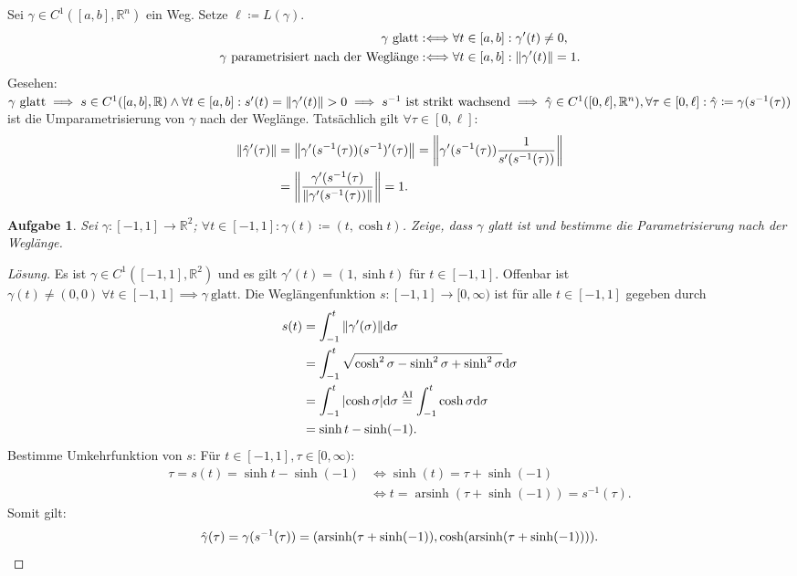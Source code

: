\documentclass[a4paper]{article}
\newtheorem{aufgabe}{Aufgabe}
\theoremstyle{definition}
\theoremstyle{remark}
\newcommand{\defiff}{:\Longleftrightarrow}
\renewcommand{\d}[1]{\mathrm{d}#1}
\DeclareMathOperator{\arsinh}{arsinh}
\begin{document}
		Sei $\gamma\in C^1([a, b], \mathbb{R}^n)$ ein Weg. Setze $\ell\coloneqq L(\gamma)$.
		\begin{align*}
			\gamma~\text{glatt}&\defiff\forall t\in[a, b]:\gamma'(t)\neq0,\\
			\gamma~\text{parametrisiert nach der Weglänge}&\defiff\forall t\in[a,b]:\norm{\gamma'(t)}=1.
		\end{align*}
		Gesehen: $\gamma~\text{glatt}\implies s\in C^1([a, b], \mathbb{R})\wedge\forall t\in[a, b]:
		s'(t)=\norm{\gamma'(t)}>0\implies s^{-1}~\text{ist strikt wachsend}
		\implies\hat{\gamma}\in C^1([0, \ell], \mathbb{R}^n), \forall\tau\in[0, \ell]:
		\hat{\gamma}\coloneqq\gamma(s^{-1}(\tau))$ ist die Umparametrisierung von
		$\gamma$ nach der Weglänge. Tatsächlich gilt $\forall\tau\in[0, \ell]$:
		\begin{align*}
			\norm{\hat{\gamma}'(\tau)}&=\norm{\gamma'(s^{-1}(\tau))(s^{-1})'(\tau)}=\norm{\gamma'(s^{-1}(\tau))\frac{1}{s'(s^{-1}(\tau))}}\\
			&= \norm{\frac{\gamma'(s^{-1}(\tau)}{\norm{\gamma'(s^{-1}(\tau))}}}=1.
		\end{align*}
		\begin{aufgabe}
			Sei $\gamma\colon[-1, 1]\to\mathbb{R}^2$; $\forall t\in[-1, 1]:\gamma(t)\coloneqq(t, \cosh t)$.
		Zeige, dass $\gamma$ glatt ist und bestimme die Parametrisierung nach der Weglänge.
		\end{aufgabe}
		\begin{proof}[Lösung]
			Es ist $\gamma\in C^1([-1, 1], \mathbb{R}^2)$ und es gilt
			$\gamma'(t)=(1, \sinh t)$ für $t\in[-1, 1]$. Offenbar ist
			$\gamma (t)\neq(0, 0)~\forall t\in[-1, 1]\implies\gamma~\text{glatt}$.
			Die Weglängenfunktion $s\colon[-1, 1]\to[0,\infty)$ ist für alle $t\in[-1, 1]$ gegeben durch
			\begin{align*}
				s(t) &= \int_{-1}^t\norm{\gamma'(\sigma)}\d{\sigma}\\
				&= \int_{-1}^t\sqrt{\cosh^2\sigma-\sinh^2\sigma+\sinh^2\sigma}\d{\sigma} \\
				&= \int_{-1}^t\abs{\cosh\sigma}\d{\sigma} \stackrel{\text{AI}}{=} \int_{-1}^t\cosh\sigma\d{\sigma} \\
				&= \sinh t - \sinh(-1).
			\end{align*}
			Bestimme Umkehrfunktion von $s$: Für $t\in[-1, 1], \tau\in[0, \infty)$:
			\begin{align*}
				\tau=s(t)=\sinh t- \sinh(-1)&\iff\sinh(t)=\tau+\sinh(-1)\\
				&\iff t=\arsinh(\tau+\sinh(-1))=s^{-1}(\tau).
			\end{align*}
			Somit gilt:
			\begin{equation*}
				\hat{\gamma}(\tau)=\gamma(s^{-1}(\tau))=(\arsinh(\tau + \sinh(-1)), \cosh(\arsinh(\tau + \sinh(-1)))).\qedhere
			\end{equation*}
		\end{proof}
\end{document}
